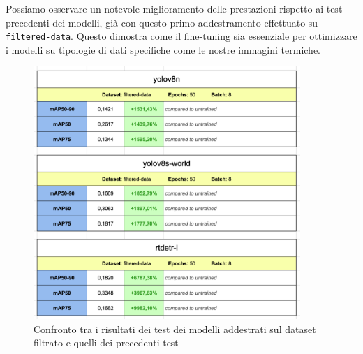 Possiamo osservare un notevole miglioramento delle prestazioni rispetto ai test precedenti dei modelli, già con questo primo addestramento effettuato su \texttt{filtered-data}.
Questo dimostra come il fine-tuning sia essenziale per ottimizzare i modelli su tipologie di dati specifiche come le nostre immagini termiche.

\clearpage

\begin{figure}[ht]
    \centering
    \includegraphics[width=0.9\textwidth]{files/capitoli/4-sperimentazione-risultati/assets/filtered-data-compare.png}
    \caption{\label{fig:filtered-data-compare}Confronto tra i risultati dei test dei modelli addestrati sul dataset filtrato e quelli dei precedenti test}
\end{figure}

\clearpage

